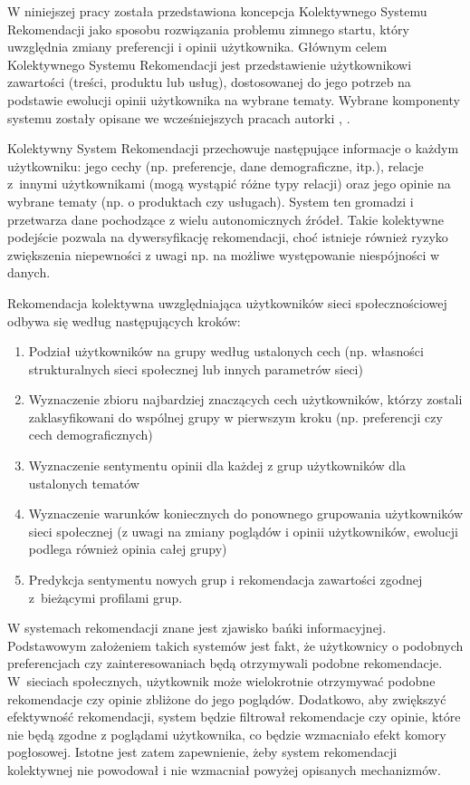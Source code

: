W niniejszej pracy została przedstawiona koncepcja Kolektywnego Systemu Rekomendacji jako sposobu rozwiązania problemu zimnego startu, który uwzględnia zmiany preferencji i opinii użytkownika. Głównym celem Kolektywnego Systemu Rekomendacji jest przedstawienie użytkownikowi zawartości (treści, produktu lub usług), dostosowanej do jego potrzeb na podstawie ewolucji opinii użytkownika na wybrane tematy. Wybrane komponenty systemu zostały opisane we wcześniejszych pracach autorki \cite{maleszka1}, \cite{mal}.

Kolektywny System Rekomendacji przechowuje następujące informacje o każdym użytkowniku: jego cechy (np. preferencje, dane demograficzne, itp.), relacje z~innymi użytkownikami (mogą wystąpić różne typy relacji) oraz jego opinie na wybrane tematy (np. o produktach czy usługach). System ten gromadzi i przetwarza dane pochodzące z wielu autonomicznych źródeł. Takie kolektywne podejście pozwala na dywersyfikację rekomendacji, choć istnieje również ryzyko zwiększenia niepewności z uwagi np. na możliwe występowanie niespójności w danych.

Rekomendacja kolektywna uwzględniająca użytkowników sieci społecznościowej odbywa się według następujących kroków:

\begin{enumerate}
\item Podział użytkowników na grupy według ustalonych cech (np. własności strukturalnych sieci społecznej lub innych parametrów sieci)
\item Wyznaczenie zbioru najbardziej znaczących cech użytkowników, którzy zostali zaklasyfikowani do wspólnej grupy w pierwszym kroku (np. preferencji czy cech demograficznych)
\item Wyznaczenie sentymentu opinii dla każdej z grup użytkowników dla ustalonych tematów
\item Wyznaczenie warunków koniecznych do ponownego grupowania użytkowników sieci społecznej (z uwagi na zmiany poglądów i opinii użytkowników, ewolucji podlega również opinia całej grupy)
\item Predykcja sentymentu nowych grup i rekomendacja zawartości zgodnej z~bieżącymi profilami grup.
\end{enumerate}

W systemach rekomendacji znane jest zjawisko bańki informacyjnej. Podstawowym założeniem takich systemów jest fakt, że użytkownicy o podobnych preferencjach czy zainteresowaniach będą otrzymywali podobne rekomendacje. W~sieciach społecznych, użytkownik może wielokrotnie otrzymywać podobne rekomendacje czy opinie zbliżone do jego poglądów. Dodatkowo, aby zwiększyć efektywność rekomendacji, system będzie filtrował rekomendacje czy opinie, które nie będą zgodne z poglądami użytkownika, co będzie wzmacniało efekt komory pogłosowej. Istotne jest zatem zapewnienie, żeby system rekomendacji kolektywnej nie powodował i nie wzmacniał powyżej opisanych mechanizmów.

